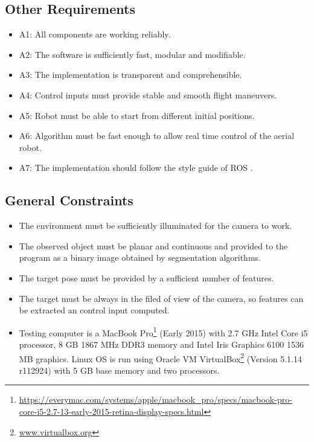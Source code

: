 \subsection{Other Requirements}
\label{sec:other-requirements}

\begin{itemize}
	\item A1: All components are working reliably.
	\item A2: The software is sufficiently fast, modular and modifiable.
	\item A3: The implementation is transparent and comprehensible.
	\item A4: Control inputs must provide stable and smooth flight maneuvers.
	\item A5: Robot must be able to start from different initial positions.
	\item A6: Algorithm must be fast enough to allow real time control of the aerial robot.
	\item A7: The implementation should follow the style guide of ROS \cite{ROS_Style}.
\end{itemize}

\subsection{General Constraints}
\label{sec:general-constraints}

\begin{itemize}
	\item The environment must be sufficiently illuminated for the camera to work.
	\item The observed object must be planar and continuous and provided to the program as a binary image obtained by segmentation algorithms.
	\item The target pose must be provided by a sufficient number of features.
	\item The target must be always in the filed of view of the camera, so features can be extracted an control input computed.
	\item Testing computer is a MacBook Pro\footnote{\url{https://everymac.com/systems/apple/macbook_pro/specs/macbook-pro-core-i5-2.7-13-early-2015-retina-display-specs.html}} (Early 2015) with 2.7 GHz Intel Core i5 processor, 8 GB 1867 MHz DDR3 memory and Intel Iris Graphics 6100 1536 MB graphics. Linux OS is run using Oracle VM VirtualBox\footnote{\url{www.virtualbox.org}} (Version 5.1.14 r112924) with 5 GB base memory and two processors.
\end{itemize}

